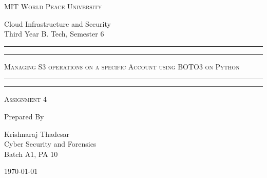 \documentclass[11pt]{article}
\begin{document}
\begin{titlepage}
    \centering


    \huge\textsc{
        MIT World Peace University
    }\\

    \vspace{0.75\baselineskip} %

    \LARGE{
        Cloud Infrastructure and Security\\
        Third Year B. Tech, Semester 6
    }

    \vfill %


    \rule{\textwidth}{1.6pt}\vspace*{-\baselineskip}\vspace*{2pt}
    \rule{\textwidth}{0.6pt}
    \vspace{0.75\baselineskip} %



    \huge{\textsc{
            Managing S3 operations on a specific Account using BOTO3 on Python
        }} \\



    \vspace{0.5\baselineskip} %
    \rule{\textwidth}{0.6pt}\vspace*{-\baselineskip}\vspace*{2.8pt}
    \rule{\textwidth}{1.6pt}

    \vspace{1\baselineskip} %


    \LARGE\textsc{
        Assignment 4
    } %
    \vfill


    Prepared By
    \vspace{0.5\baselineskip} %

    \Large{
        Krishnaraj Thadesar \\
        Cyber Security and Forensics\\
        Batch A1, PA 10
    }


    \vspace{0.5\baselineskip} %
    \today

\end{titlepage}
\end{document}
